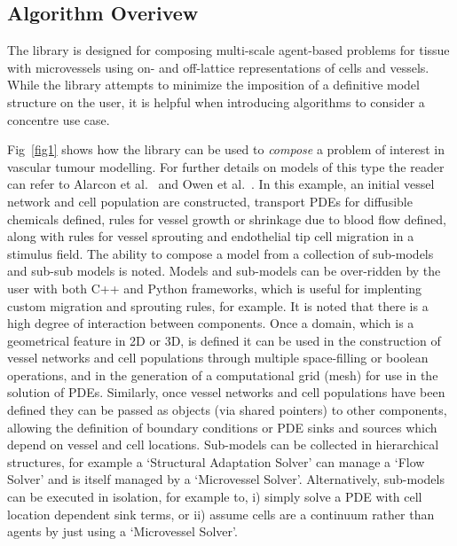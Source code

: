 \documentclass[10pt,letterpaper]{article}
\begin{document}
\subsection*{Algorithm Overivew}

The library is designed for composing multi-scale agent-based problems for tissue with microvessels using on- and off-lattice representations of cells and vessels. While the library attempts to minimize the imposition of a definitive model structure on the user, it is helpful when introducing algorithms to consider a concentre use case. 

Fig~\ref{fig1} shows how the library can be used to \emph{compose} a problem of interest in vascular tumour modelling. For further details on models of this type the reader can refer to Alarcon et al.~\cite{Alarcon2005} and Owen et al.~\cite{Owen2011}. In this example, an initial vessel network and cell population are constructed, transport PDEs for diffusible chemicals defined, rules for vessel growth or shrinkage due to blood flow defined, along with rules for vessel sprouting and endothelial tip cell migration in a stimulus field. The ability to compose a model from a collection of sub-models and sub-sub models is noted. Models and sub-models can be over-ridden by the user with both C++ and Python frameworks, which is useful for implenting custom migration and sprouting rules, for example. It is noted that there is a high degree of interaction between components. Once a domain, which is a geometrical feature in 2D or 3D, is defined it can be used in the construction of vessel networks and cell populations through multiple space-filling or boolean operations, and in the generation of a computational grid (mesh) for use in the solution of PDEs. Similarly, once vessel networks and cell populations have been defined they can be passed as objects (via shared pointers) to other components, allowing the definition of boundary conditions or PDE sinks and sources which depend on vessel and cell locations. Sub-models can be collected in hierarchical structures, for example a `Structural Adaptation Solver' can manage a `Flow Solver' and is itself managed by a `Microvessel Solver'. Alternatively, sub-models can be executed in isolation, for example to, i) simply solve a PDE with cell location dependent sink terms, or ii) assume cells are a continuum rather than agents by just using a `Microvessel Solver'.
\end{document}
